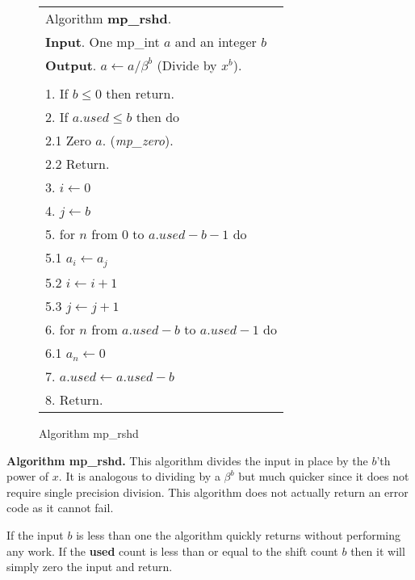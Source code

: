 \documentclass[b5paper]{book}
\begin{document}
\newpage\begin{figure}[!here]
\begin{small}
\begin{center}
\begin{tabular}{l}
\hline Algorithm \textbf{mp\_rshd}. \\
\textbf{Input}.   One mp\_int $a$ and an integer $b$ \\
\textbf{Output}.  $a \leftarrow a / \beta^b$ (Divide by $x^b$). \\
\hline \\
1.  If $b \le 0$ then return. \\
2.  If $a.used \le b$ then do \\
\hspace{3mm}2.1  Zero $a$.  (\textit{mp\_zero}). \\
\hspace{3mm}2.2  Return. \\
3.  $i \leftarrow 0$ \\
4.  $j \leftarrow b$ \\
5.  for $n$ from 0 to $a.used - b - 1$ do \\
\hspace{3mm}5.1  $a_i \leftarrow a_j$ \\
\hspace{3mm}5.2  $i \leftarrow i + 1$ \\
\hspace{3mm}5.3  $j \leftarrow j + 1$ \\
6.  for $n$ from $a.used - b$ to $a.used - 1$ do \\
\hspace{3mm}6.1  $a_n \leftarrow 0$ \\
7.  $a.used \leftarrow a.used - b$ \\
8.  Return. \\
\hline
\end{tabular}
\end{center}
\end{small}
\caption{Algorithm mp\_rshd}
\end{figure}

\textbf{Algorithm mp\_rshd.}
This algorithm divides the input in place by the $b$'th power of $x$.  It is analogous to dividing by a $\beta^b$ but much quicker since
it does not require single precision division.  This algorithm does not actually return an error code as it cannot fail.  

If the input $b$ is less than one the algorithm quickly returns without performing any work.  If the \textbf{used} count is less than or equal
to the shift count $b$ then it will simply zero the input and return.
\end{document}
